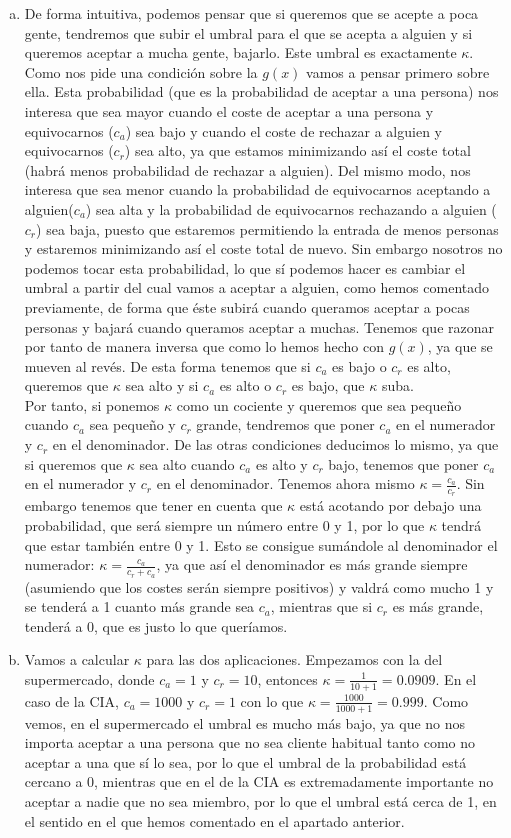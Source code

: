 \documentclass[12pt]{article}
\theoremstyle{definition}
\begin{document}
\begin{pregunta}
\begin{enumerate}[a)]
\item De forma intuitiva, podemos pensar que si queremos que se acepte a poca gente, tendremos que subir el umbral para el que se acepta a alguien y si queremos aceptar a mucha gente, bajarlo. Este umbral es exactamente $\kappa$. Como nos pide una condición sobre la $g(x)$ vamos a pensar primero sobre ella. Esta probabilidad (que es la probabilidad de aceptar a una persona) nos interesa que sea mayor cuando el coste de aceptar a una persona y equivocarnos ($c_a$) sea bajo y cuando el coste de rechazar a alguien y equivocarnos ($c_r$) sea alto, ya que estamos minimizando así el coste total (habrá menos probabilidad de rechazar a alguien). Del mismo modo, nos interesa que sea menor cuando la probabilidad de equivocarnos aceptando a alguien($c_a$) sea alta y la probabilidad de equivocarnos rechazando a alguien ($c_r$) sea baja, puesto que estaremos permitiendo la entrada de menos personas y estaremos minimizando así el coste total de nuevo. Sin embargo nosotros no podemos tocar esta probabilidad, lo que sí podemos hacer es cambiar el umbral a partir del cual vamos a aceptar a alguien, como hemos comentado previamente, de forma que éste subirá cuando queramos aceptar a pocas personas y bajará cuando queramos aceptar a muchas. Tenemos que razonar por tanto de manera inversa que como lo hemos hecho con $g(x)$, ya que se mueven al revés. De esta forma tenemos que si $c_a$ es bajo o $c_r$ es alto, queremos que $\kappa$ sea alto y si $c_a$ es alto o $c_r$ es bajo, que $\kappa$ suba.\\
Por tanto, si ponemos $\kappa$ como un cociente y queremos que sea pequeño cuando $c_a$ sea pequeño y $c_r$ grande, tendremos que poner $c_a$ en el numerador y $c_r$ en el denominador. De las otras condiciones deducimos lo mismo, ya que si queremos que $\kappa$ sea alto cuando $c_a$ es alto y $c_r$ bajo, tenemos que poner $c_a$ en el numerador y $c_r$ en el denominador. Tenemos ahora mismo $\kappa = \frac{c_a}{c_r}$. Sin embargo tenemos que tener en cuenta que $\kappa$ está acotando por debajo una probabilidad, que será siempre un número entre 0 y 1, por lo que $\kappa$ tendrá que estar también entre 0 y 1. Esto se consigue sumándole al denominador el numerador: $\kappa=\frac{c_a}{c_r+c_a}$, ya que así el denominador es más grande siempre (asumiendo que los costes serán siempre positivos) y valdrá como mucho 1 y se tenderá a 1 cuanto más grande sea $c_a$, mientras que si $c_r$ es más grande, tenderá a 0, que es justo lo que queríamos.
\item Vamos a calcular $\kappa$ para las dos aplicaciones. Empezamos con la del supermercado, donde $c_a=1$ y $c_r=10$, entonces $\kappa=\frac{1}{10+1}=0.0909$. En el caso de la CIA, $c_a=1000$ y $c_r=1$ con lo que $\kappa=\frac{1000}{1000+1}=0.999$. Como vemos, en el supermercado el umbral es mucho más bajo, ya que no nos importa aceptar a una persona que no sea cliente habitual tanto como no aceptar a una que sí lo sea, por lo que el umbral de la probabilidad está cercano a 0, mientras que en el de la CIA es extremadamente importante no aceptar a nadie que no sea miembro, por lo que el umbral está cerca de 1, en el sentido en el que hemos comentado en el apartado anterior.

\end{enumerate}
\end{pregunta}
\end{document}
